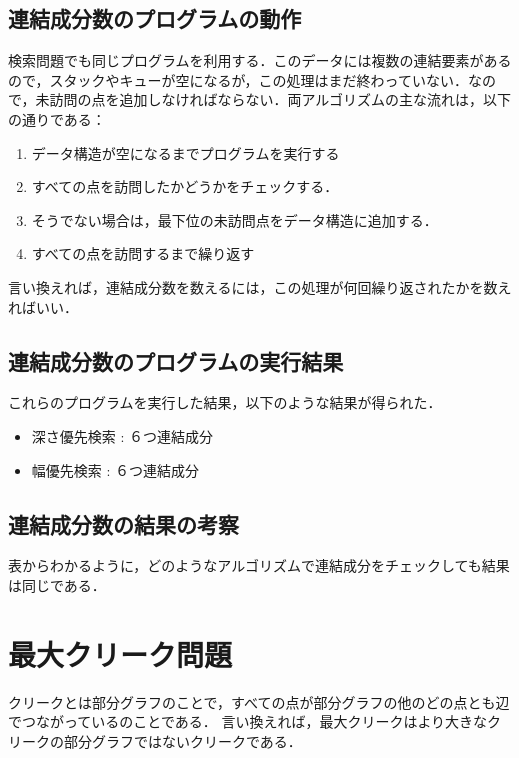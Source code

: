 \documentclass[a4j, titlepage]{jarticle}
\begin{document}
    \subsection{連結成分数のプログラムの動作}
    検索問題でも同じプログラムを利用する．このデータには複数の連結要素があるので，スタックやキューが空になるが，この処理はまだ終わっていない．なので，未訪問の点を追加しなければならない．両アルゴリズムの主な流れは，以下の通りである：
    \begin{screen}
        \begin{enumerate}
            \item データ構造が空になるまでプログラムを実行する
            \item すべての点を訪問したかどうかをチェックする．
            \item そうでない場合は，最下位の未訪問点をデータ構造に追加する．
            \item すべての点を訪問するまで繰り返す
        \end{enumerate}
    \end{screen}
    言い換えれば，連結成分数を数えるには，この処理が何回繰り返されたかを数えればいい．
    
    \subsection{連結成分数のプログラムの実行結果}
    これらのプログラムを実行した結果，以下のような結果が得られた．
    \begin{screen}
        \begin{itemize}
            \item 深さ優先検索 : ６つ連結成分
            \item 幅優先検索 : ６つ連結成分
        \end{itemize}
    \end{screen}
    
    \subsection{連結成分数の結果の考察}
    表からわかるように，どのようなアルゴリズムで連結成分をチェックしても結果は同じである．
    
\section{最大クリーク問題}
クリークとは部分グラフのことで，すべての点が部分グラフの他のどの点とも辺でつながっているのことである．
言い換えれば，最大クリークはより大きなクリークの部分グラフではないクリークである．
\end{document}
